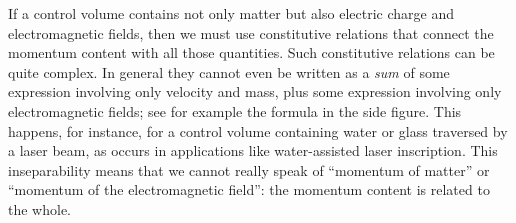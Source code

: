 \documentclass[a4paper,12pt,%
onecolumn,oneside,%
british%
]{memoir}
\renewcommand*{\bm}[1]{\textpdfrender{TextRenderingMode=2,LineWidth=0.2pt}{\boldsymbol{#1}}}
\renewcommand*{\|}[1][]{\nonscript\:#1\vert\nonscript\:\mathopen{}}
\newcommand*{\sect}{\S}%
\renewcommand*{\autoref}[3][\sect\,\ref]{\textcolor{blue}{#3}
\raisebox{0.6ex}{\color{blue}\miniscule%
\faIcon{angle-right}%
\;#1{#2}\;p.\,\pageref{#2}}}
\newcommand*{\yN}{N}
\newcommand*{\yrho}{\rho}
\newcommand*{\ym}{m}%
\newcommand*{\yP}{\bm{P}}
\begin{document}
If a control volume contains not only matter but also electric charge and electromagnetic fields, then we must use constitutive relations that connect the momentum content with all those quantities. Such constitutive relations can be quite complex. In general they cannot even be written as a \emph{sum} of some expression involving only velocity and mass, plus some expression involving only electromagnetic fields; see for example the formula in the side figure.
%
%
This happens, for instance, for a control volume containing water or glass traversed by a laser beam, as occurs in applications like water-assisted laser inscription. This inseparability means that we cannot really speak of \enquote{momentum of matter} or \enquote{momentum of the electromagnetic field}: the momentum content is related to the whole.

% 
%
\end{document}
